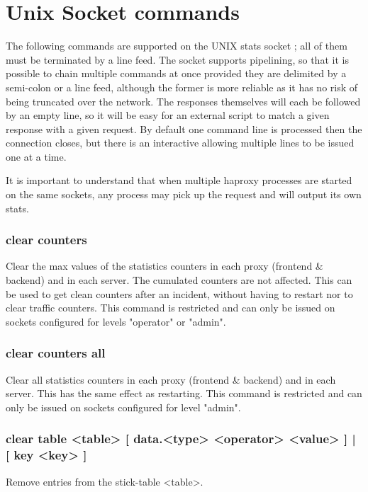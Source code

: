 \section{Unix Socket commands}
\label{sec:socket_commands}

The following commands are supported on the UNIX stats socket ; all of them
must be terminated by a line feed. The socket supports pipelining, so that it
is possible to chain multiple commands at once provided they are delimited by
a semi-colon or a line feed, although the former is more reliable as it has no
risk of being truncated over the network. The responses themselves will each be
followed by an empty line, so it will be easy for an external script to match a
given response with a given request. By default one command line is processed
then the connection closes, but there is an interactive allowing multiple lines
to be issued one at a time.

It is important to understand that when multiple haproxy processes are started
on the same sockets, any process may pick up the request and will output its
own stats.

\subsubsection[clear counters]{clear counters}
  Clear the max values of the statistics counters in each proxy (frontend \&
  backend) and in each server. The cumulated counters are not affected. This
  can be used to get clean counters after an incident, without having to
  restart nor to clear traffic counters. This command is restricted and can
  only be issued on sockets configured for levels "operator" or "admin".

\subsubsection[clear counters all]{clear counters all}
  Clear all statistics counters in each proxy (frontend \& backend) and in each
  server. This has the same effect as restarting. This command is restricted
  and can only be issued on sockets configured for level "admin".

\subsubsection[clear table]{clear table <table> [ data.<type> <operator> <value> ] | [ key <key> ]}
  Remove entries from the stick-table <table>.

